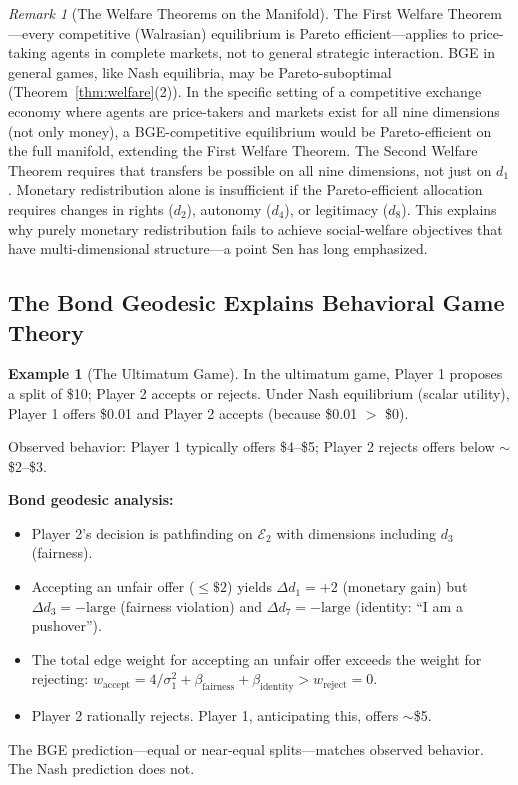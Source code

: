 \documentclass[12pt]{article}
\theoremstyle{definition}
\newtheorem{example}[theorem]{Example}
\theoremstyle{remark}
\newtheorem{remark}[theorem]{Remark}
\newcommand{\E}{\mathcal{E}}               %
\begin{document}
\begin{remark}[The Welfare Theorems on the Manifold]
The First Welfare Theorem---every competitive (Walrasian) equilibrium is Pareto efficient---applies to price-taking agents in complete markets, not to general strategic interaction.  BGE in general games, like Nash equilibria, may be Pareto-suboptimal (Theorem~\ref{thm:welfare}(2)).  In the specific setting of a competitive exchange economy where agents are price-takers and markets exist for all nine dimensions (not only money), a BGE-competitive equilibrium would be Pareto-efficient on the full manifold, extending the First Welfare Theorem.  The Second Welfare Theorem requires that transfers be possible on all nine dimensions, not just on $d_1$.  Monetary redistribution alone is insufficient if the Pareto-efficient allocation requires changes in rights ($d_2$), autonomy ($d_4$), or legitimacy ($d_8$).  This explains why purely monetary redistribution fails to achieve social-welfare objectives that have multi-dimensional structure---a point Sen \cite{sen1999} has long emphasized.
\end{remark}

\subsection{The Bond Geodesic Explains Behavioral Game Theory}

\begin{example}[The Ultimatum Game]
\label{ex:ultimatum}
In the ultimatum game, Player 1 proposes a split of \$10; Player 2 accepts or rejects.  Under Nash equilibrium (scalar utility), Player 1 offers \$0.01 and Player 2 accepts (because \$0.01 $>$ \$0).

Observed behavior: Player 1 typically offers \$4--\$5; Player 2 rejects offers below $\sim$\$2--\$3.

\textbf{Bond geodesic analysis:}
\begin{itemize}
    \item Player 2's decision is pathfinding on $\E_2$ with dimensions including $d_3$ (fairness).
    \item Accepting an unfair offer ($\leq \$2$) yields $\Delta d_1 = +2$ (monetary gain) but $\Delta d_3 = -\text{large}$ (fairness violation) and $\Delta d_7 = -\text{large}$ (identity: ``I am a pushover'').
    \item The total edge weight for accepting an unfair offer exceeds the weight for rejecting: $w_{\text{accept}} = 4/\sigma_1^2 + \beta_{\text{fairness}} + \beta_{\text{identity}} > w_{\text{reject}} = 0$.
    \item Player 2 rationally rejects.  Player 1, anticipating this, offers $\sim$\$5.
\end{itemize}
The BGE prediction---equal or near-equal splits---matches observed behavior.  The Nash prediction does not.
\end{example}
\end{document}

